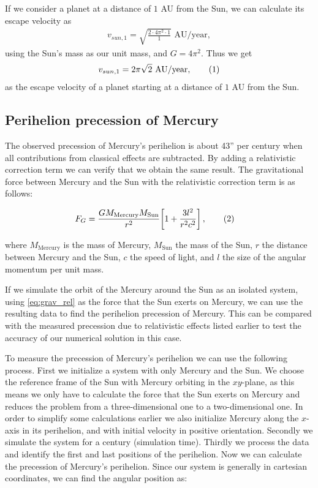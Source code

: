 \documentclass[reprint,english,notitlepage]{revtex4-1}  %
\newcommand\numberthis{\addtocounter{equation}{1}\tag{\theequation}}
\begin{document}
If we consider a planet at a distance of \(1\) AU from the Sun, we can calculate its escape velocity as
\begin{align*}
	v_{sun, 1} = \sqrt{\frac{2\cdot 4\pi^{2}\cdot 1}{1}} \text{ AU/year},
\end{align*}
using the Sun's mass as our unit mass, and \(G = 4\pi^{2}\). Thus we get
\begin{align*}
	v_{sun, 1} = 2\pi\sqrt{2}\text{ AU/year}, \numberthis \label{eq:esc_sun_1au}
\end{align*}
as the escape velocity of a planet starting at a distance of \(1\) AU from the Sun.

\subsection{Perihelion precession of Mercury} \label{sec:II:f}

The observed precession of Mercury's perihelion is about 43'' per century when all contributions from classical effects are subtracted. By adding a relativistic correction term we can verify that we obtain the same result. The gravitational force between Mercury and the Sun with the relativistic correction term is as follows:

\begin{align*}
F_G &= \frac{GM_\text{Mercury} M_\text{Sun}}{r^2} \bigg[ 1 + \frac{3l^2}{r^2 c^2}\bigg] \, , \numberthis \label{eq:grav_rel} 
\end{align*}

where $M_\text{Mercury}$ is the mass of Mercury, $M_\text{Sun}$ the mass of the Sun, $r$ the distance between Mercury and the Sun, $c$ the speed of light, and $l$ the size of the angular momentum per unit mass. 

If we simulate the orbit of the Mercury around the Sun as an isolated system, using \eqref{eq:grav_rel} as the force that the Sun exerts on Mercury, we can use the resulting data to find the perihelion precession of Mercury. This can be compared with the measured precession due to relativistic effects listed earlier to test the accuracy of our numerical solution in this case. 

To measure the precession of Mercury's perihelion we can use the following process. First we initialize a system with only Mercury and the Sun. We choose the reference frame of the Sun with Mercury orbiting in the $xy$-plane, as this means we only have to calculate the force that the Sun exerts on Mercury and reduces the problem from a three-dimensional one to a two-dimensional one. In order to simplify some calculations earlier we also initialize Mercury along the $x$-axis in its perihelion, and with initial velocity in positive orientation. Secondly we simulate the system for a century (simulation time). Thirdly we process the data and identify the first and last positions of the perihelion. Now we can calculate the precession of Mercury's perihelion. Since our system is generally in cartesian coordinates, we can find the angular position as:
\end{document}
